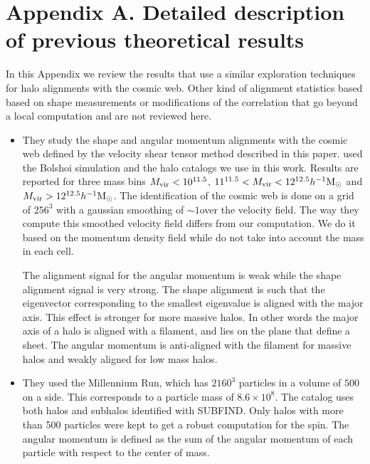 \documentclass[useAMS,usenatbib]{mn2e}
\newcommand{\hMpc}{{\ifmmode{h^{-1}{\rm Mpc}}\else{$h^{-1}$Mpc }\fi}}
\newcommand{\hMsun}{{\ifmmode{h^{-1}{\rm
        {M_{\odot}}}}\else{$h^{-1}{\rm{M_{\odot}}}$~}\fi}}
\begin{document}
\section*{Appendix A. Detailed description of previous theoretical results}

In this Appendix we review the results that use a similar exploration
techniques for halo alignments with the cosmic web. Other kind of
alignment statistics based based on shape measurements
\citep{Basilakos2006} or modifications of the correlation
\citep[e.g.][]{Paz2008,Faltenbacher2009} that go beyond a local
computation and are not reviewed here. 

\begin{itemize}


\item
\cite{Libeskind2013}

They study the shape and angular momentum alignments with the cosmic
web defined by the velocity shear tensor method described in this
paper.  \cite{Libeskind2013} used the Bolshoi simulation and the halo
catalogs we use in this work. Results are reported for three mass bins $M_{\rm
 vir}<10^{11.5}$\hMsun, $11^{11.5}<M_{\rm vir}<12^{12.5}\hMsun$ and
$M_{\rm  vir}>12^{12.5}\hMsun$. The identification of the cosmic web
is done on a grid of $256^3$ with a gaussian smoothing of $\sim
1$\hMpc over the velocity field. The way they compute this smoothed
velocity field differs from our computation. We do it based on the
momentum density field while \cite{Libesking2013} do not take into
account the mass in each cell.


The alignment signal for the angular momentum is weak while the shape
alignment signal is very strong. The shape alignment is such that the
eigenvector corresponding to the smallest eigenvalue is aligned with
the major axis. This effect is stronger for more massive halos.  In
other words the major axis of a halo is aligned with a filament, and
lies on the plane that define a sheet. The angular momentum is
anti-aligned with the filament for massive halos and weakly aligned
for low mass halos. 

\item
\cite{Trowland2013}

They used the Millennium Run, which has $2160^3$ particles in a volume
of $500$\hMpc on a side. This corresponds to a particle mass of
$8.6\times 10^{8}$\hMsun. The catalog uses both halos and subhalos
identified with SUBFIND. Only halos with more than 500 particles were
kept to get a robust computation for the spin. The angular momentum is
defined as the sum of the angular momentum of each particle with
respect to the center of mass. 



\end{itemize}
\end{document}
